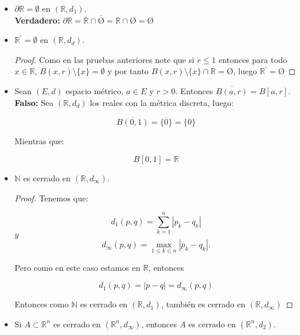 \begin{itemize}[leftmargin=*]
    \item $\partial \mathbb{R}=\emptyset$ en $\left(\mathbb{R}, d_1\right)$.\\
    
    \textbf{Verdadero: }$\partial \mathbb{R}=$$\overline{\mathbb{R}}\cap$$\overline{\text{\O}}=\mathbb{R}\cap$\O$=$\O


    \item $\mathbb{R}^{\prime}=\emptyset$ en $\left(\mathbb{R}, d_d\right)$.\\
    
    \begin{proof}
        Como en las pruebas anteriores note que si $r\leq1$ entonces para todo $x\in \mathbb{R}$, $B(x,r)\setminus\{x\}=$$\emptyset$ y por tanto $B(x,r)\setminus\{x\}\cap \mathbb{R}=$\O, luego $\mathbb{R}^{\prime}=$\O
    \end{proof}


    \item Sean $(E, d)$ espacio métrico, $a \in E$ y $r>0$. Entonces $\overline{B(a, r)}=B[a, r]$.\\
    
    \textbf{Falso: }Sea $(\mathbb{R},d_d)$ los reales con la métrica discreta, luego:

    $$\overline{B(0,1)}=\overline{\{0\}}=\{0\}$$

Mientras que:

$$B[0,1]=\mathbb{R}$$

    \item $\mathbb{N}$ es cerrado en $\left(\mathbb{R}, d_{\infty}\right)$.\\ 
    
    \begin{proof}
        Tenemos que: 

    $$
d_1(p, q)=\sum_{k=1}^n\left|p_k-q_k\right|
$$
$y$
$$
d_{\infty}(p, q)=\operatorname{max}_{1 \leq k \leq n}\left|p_k-q_k\right| .
$$

Pero como en este caso estamos en $\mathbb{R}$, entonces 

$$
d_1(p, q)=|p-q|=d_{\infty}(p,q)
$$

Entonces como $\mathbb{N}$ es cerrado en $(\mathbb{R},d_1)$, también es cerrado en $(\mathbb{R},d_{\infty})$

    \end{proof}

    \item Si $A \subset \mathbb{R}^n$ es cerrado en $\left(\mathbb{R}^n, d_{\infty}\right)$, entonces $A$ es cerrado en $\left(\mathbb{R}^n, d_2\right)$.\\
    

\end{itemize}
